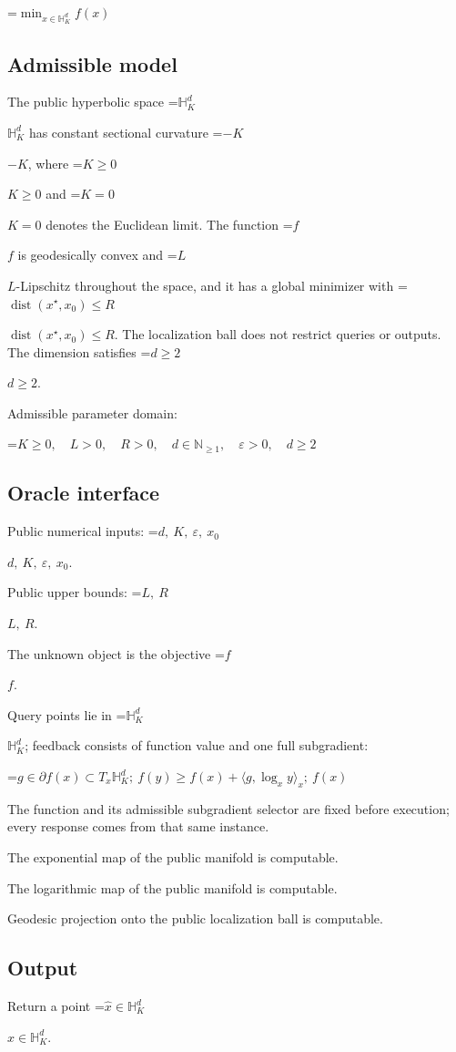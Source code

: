 \documentclass[10pt,a4paper]{article}
\newcommand{\AtlasMath}[1]{\par\begingroup\centering\setbox0=\hbox{$\displaystyle #1$}\ifdim\wd0>1.4\linewidth\typeout{ATLAS WIDE FORMULA: \the\wd0}\fi\ifdim\wd0>\linewidth\resizebox{\linewidth}{!}{\box0}\else\box0\fi\par\endgroup}
\newcommand{\AtlasInlineMath}[1]{\begingroup\setbox0=\hbox{$#1$}\ifdim\wd0>.4\linewidth\endgroup\AtlasMath{#1}\else\endgroup$#1$\fi}
\begin{document}
\AtlasMath{\min_{x\in\mathbb{H}_K^d}f(x)}


\subsection{Admissible model}
The public hyperbolic space \AtlasInlineMath{\mathbb H_K^d} has constant sectional curvature \AtlasInlineMath{-K}, where \AtlasInlineMath{K\ge0} and \AtlasInlineMath{K=0} denotes the Euclidean limit. The function \AtlasInlineMath{f} is geodesically convex and \AtlasInlineMath{L}-Lipschitz throughout the space, and it has a global minimizer with \AtlasInlineMath{\operatorname{dist}(x^\star,x_0)\le R}. The localization ball does not restrict queries or outputs. The dimension satisfies \AtlasInlineMath{d\ge2}.

Admissible parameter domain:


\AtlasMath{K\ge0,\quad L>0,\quad R>0,\quad d\in\mathbb{N}_{\ge1},\quad \varepsilon>0,\quad d\ge2}


\subsection{Oracle interface}
Public numerical inputs: \AtlasInlineMath{d,\ K,\ \varepsilon,\ x_0}.

Public upper bounds: \AtlasInlineMath{L,\ R}.

The unknown object is the objective \AtlasInlineMath{f}.

Query points lie in \AtlasInlineMath{\mathbb{H}_K^d}; feedback consists of function value and one full subgradient:


\AtlasMath{g\in\partial f(x)\subset T_x\mathbb{H}_K^d;\ f(y)\ge f(x)+\langle g,\log_x y\rangle_x;\ f(x)}


The function and its admissible subgradient selector are fixed before execution; every response comes from that same instance.

The exponential map of the public manifold is computable.

The logarithmic map of the public manifold is computable.

Geodesic projection onto the public localization ball is computable.

\subsection{Output}
Return a point \AtlasInlineMath{\widehat x\in\mathbb H_K^d}.
\end{document}
